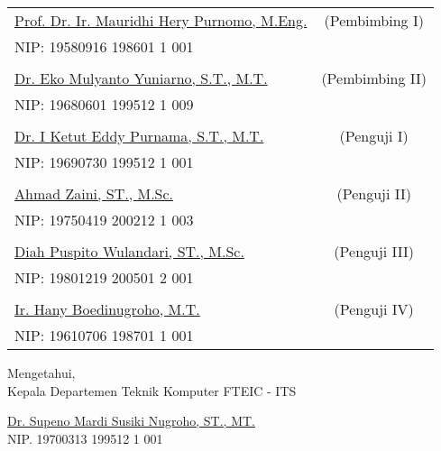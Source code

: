     \noindent
    \begin{tabularx}{\textwidth}{X c}
      \underline{Prof. Dr. Ir. Mauridhi Hery Purnomo, M.Eng.}          & (Pembimbing I) \\
      NIP: 	19580916 198601 1 001
      &  \\
      &  \\
      \underline{Dr. Eko Mulyanto Yuniarno, S.T., M.T.}     & (Pembimbing II) \\
      NIP: 19680601 199512 1 009        
      &  \\
      &  \\
      \underline{Dr. I Ketut Eddy Purnama, S.T., M.T.}  & (Penguji I) \\
      NIP: 19690730 199512 1 001        
      &  \\
      &  \\
      \underline{Ahmad Zaini, ST., M.Sc.}  & (Penguji II) \\
      NIP: 19750419 200212 1 003        
      &  \\
      &  \\
      \underline{Diah Puspito Wulandari, ST., M.Sc.}             & (Penguji III) \\
      NIP: 19801219 200501 2 001        
      &  \\
      &  \\
      \underline{Ir. Hany Boedinugroho, M.T.}             & (Penguji IV) \\
      NIP: 19610706 198701 1 001        & \\
    \end{tabularx}
  \endgroup

  \vspace{1ex}

  \begin{center}
    Mengetahui, \\
    Kepala Departemen Teknik Komputer FTEIC - ITS \\

    \vspace{10ex}

    \underline{Dr. Supeno Mardi Susiki Nugroho, ST., MT.} \\
    NIP. 19700313 199512 1 001
  \end{center}
\endgroup
